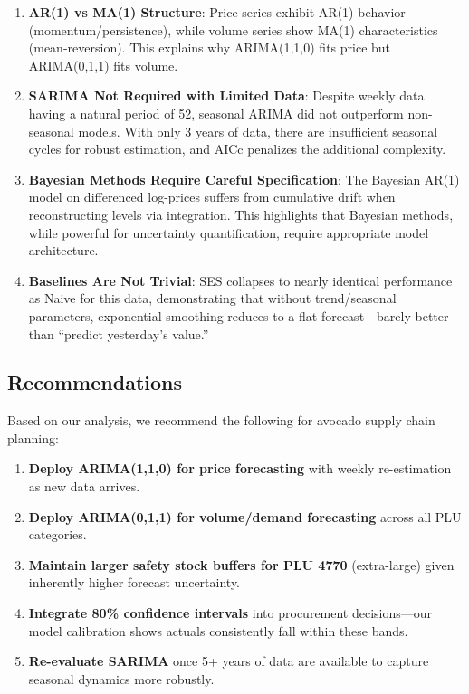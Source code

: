 \documentclass[12pt]{article}
\begin{document}
\begin{enumerate}
    \item \textbf{AR(1) vs MA(1) Structure}: Price series exhibit AR(1) behavior (momentum/persistence), while volume series show MA(1) characteristics (mean-reversion). This explains why ARIMA(1,1,0) fits price but ARIMA(0,1,1) fits volume.
    
    \item \textbf{SARIMA Not Required with Limited Data}: Despite weekly data having a natural period of 52, seasonal ARIMA did not outperform non-seasonal models. With only 3 years of data, there are insufficient seasonal cycles for robust estimation, and AICc penalizes the additional complexity.
    
    \item \textbf{Bayesian Methods Require Careful Specification}: The Bayesian AR(1) model on differenced log-prices suffers from cumulative drift when reconstructing levels via integration. This highlights that Bayesian methods, while powerful for uncertainty quantification, require appropriate model architecture.
    
    \item \textbf{Baselines Are Not Trivial}: SES collapses to nearly identical performance as Naive for this data, demonstrating that without trend/seasonal parameters, exponential smoothing reduces to a flat forecast---barely better than ``predict yesterday's value.''
\end{enumerate}

\subsection{Recommendations}

Based on our analysis, we recommend the following for avocado supply chain planning:

\begin{enumerate}
    \item \textbf{Deploy ARIMA(1,1,0) for price forecasting} with weekly re-estimation as new data arrives.
    
    \item \textbf{Deploy ARIMA(0,1,1) for volume/demand forecasting} across all PLU categories.
    
    \item \textbf{Maintain larger safety stock buffers for PLU 4770} (extra-large) given inherently higher forecast uncertainty.
    
    \item \textbf{Integrate 80\% confidence intervals} into procurement decisions---our model calibration shows actuals consistently fall within these bands.
    
    \item \textbf{Re-evaluate SARIMA} once 5+ years of data are available to capture seasonal dynamics more robustly.
\end{enumerate}
\end{document}
